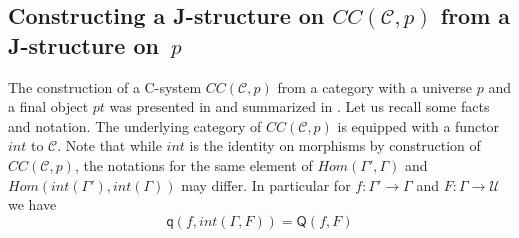 \documentclass[12pt]{article}
\numberwithin{equation}{section}
\newenvironment{eq}{\begin{equation}}{\end{equation}}
\newcommand{\llabel}[1]{\label{#1}}
\newcommand{\sr}{\rightarrow}
\newcommand{\toCC}{CC} %
\newcommand{\q}{\mathsf{q}}
\newcommand{\U}{\mathcal{U}}
\newcommand{\Q}{\mathsf{Q}}
\begin{document}
\subsection{Constructing a J-structure on $\toCC({\mathcal C},p)$ from a J-structure on~$p$}
%
The construction of a C-system $\toCC({\mathcal C},p)$ from a category with a
universe $p$ and a final object $pt$ was presented in \cite{Cfromauniverse} and
summarized in \cite{fromunivwithPi}. Let us recall some facts and
notation. The underlying category of $\toCC({\mathcal C},p)$ is equipped with a
functor $int$ to $\mathcal C$. Note that while $int$ is the identity on
morphisms by construction of $\toCC({\mathcal C},p)$, the notations for the same
element of $Hom(\Gamma',\Gamma)$ and $Hom(int(\Gamma'),int(\Gamma))$ may
differ. In particular for $f:\Gamma'\sr \Gamma$ and $F:\Gamma\sr \U$ we have
%
\begin{eq}
\llabel{2015.04.02.eq2} \q(f,int(\Gamma,F))=\Q(f,F)
\end{eq}%
%
\end{document}
